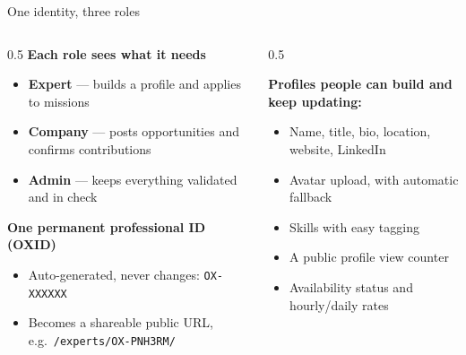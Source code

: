 \documentclass[aspectratio=169, 10pt]{beamer}
\begin{document}
\begin{frame}{One identity, three roles}
  \begin{columns}[T]
    \begin{column}{0.5\textwidth}
      \textbf{Each role sees what it needs}
      \begin{itemize}
        \item \textbf{Expert} --- builds a profile and applies to missions
        \item \textbf{Company} --- posts opportunities and confirms contributions
        \item \textbf{Admin} --- keeps everything validated and in check
      \end{itemize}
      \vspace{6pt}
      \textbf{One permanent professional ID (OXID)}
      \begin{itemize}
        \item Auto-generated, never changes: \texttt{OX-XXXXXX}
        \item Becomes a shareable public URL, e.g.\ \texttt{/experts/OX-PNH3RM/}
      \end{itemize}
    \end{column}
    \begin{column}{0.5\textwidth}
      \begin{tcolorbox}[enhanced, colback=utlight, colframe=utteal, boxrule=0pt, leftrule=3pt, arc=2pt, boxsep=8pt]
        {\color{utnavy}\textbf{Profiles people can build and keep updating:}}\\[2pt]
        \begin{itemize}\small
          \item Name, title, bio, location, website, LinkedIn
          \item Avatar upload, with automatic fallback
          \item Skills with easy tagging
          \item A public profile view counter
          \item Availability status and hourly/daily rates
        \end{itemize}
      \end{tcolorbox}
    \end{column}
  \end{columns}
\end{frame}
\end{document}
